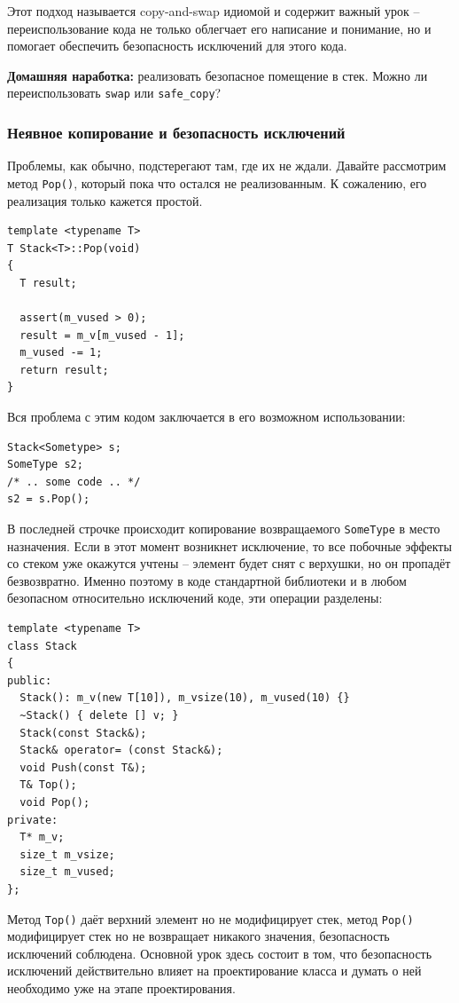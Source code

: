 \documentclass[a4paper,12pt,oneside]{article}
\begin{document}
Этот подход называется copy-and-swap идиомой и содержит важный урок -- переиспользование кода не только облегчает его написание и понимание, но и помогает обеспечить безопасность исключений для этого кода.

\textbf{Домашняя наработка:} реализовать безопасное помещение в стек. Можно ли переиспользовать \lstinline!swap! или \lstinline!safe_copy!?

\subsubsection{Неявное копирование и безопасность исключений}\label{ImplicitCopy}

Проблемы, как обычно, подстерегают там, где их не ждали. Давайте рассмотрим метод \lstinline!Pop()!, который пока что остался не реализованным. К сожалению, его реализация только кажется простой.

\begin{lstlisting}
template <typename T>
T Stack<T>::Pop(void)
{
  T result;

  assert(m_vused > 0);
  result = m_v[m_vused - 1];
  m_vused -= 1;
  return result;
}
\end{lstlisting}

Вся проблема с этим кодом заключается в его возможном использовании:

\begin{lstlisting}
Stack<Sometype> s;
SomeType s2;
/* .. some code .. */
s2 = s.Pop();
\end{lstlisting}

В последней строчке происходит копирование возвращаемого \lstinline!SomeType! в место назначения. Если в этот момент возникнет исключение, то все побочные эффекты со стеком уже окажутся учтены -- элемент будет снят с верхушки, но он пропадёт безвозвратно. Именно поэтому в коде стандартной библиотеки и в любом безопасном относительно исключений коде, эти операции разделены:

\begin{lstlisting}
template <typename T> 
class Stack
{
public:
  Stack(): m_v(new T[10]), m_vsize(10), m_vused(10) {}
  ~Stack() { delete [] v; }
  Stack(const Stack&);
  Stack& operator= (const Stack&);
  void Push(const T&);
  T& Top();
  void Pop();
private:
  T* m_v;
  size_t m_vsize;
  size_t m_vused;
};
\end{lstlisting}

Метод \lstinline!Top()! даёт верхний элемент но не модифицирует стек, метод \lstinline!Pop()! модифицирует стек но не возвращает никакого значения, безопасность исключений соблюдена. Основной урок здесь состоит в том, что безопасность исключений действительно влияет на проектирование класса и думать о ней необходимо уже на этапе проектирования.
\end{document}
